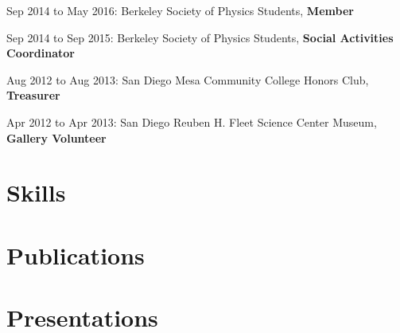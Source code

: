 \documentclass[
]{scrartcl}
\begin{document}
Sep 2014 to May 2016: Berkeley Society of Physics Students,
\textbf{Member}

Sep 2014 to Sep 2015: Berkeley Society of Physics Students,
\textbf{Social Activities Coordinator}

Aug 2012 to Aug 2013: San Diego Mesa Community College Honors Club,
\textbf{Treasurer}

Apr 2012 to Apr 2013: San Diego Reuben H. Fleet Science Center Museum,
\textbf{Gallery Volunteer}

\hypertarget{fa-tools-skills}{%
\section{\texorpdfstring{
Skills}{ Skills}}\label{fa-tools-skills}}

\hypertarget{fa-pen-nib-publications}{%
\section{\texorpdfstring{
Publications}{ Publications}}\label{fa-pen-nib-publications}}

\newrefcontext[sorting=ddt]
\printbibliography[heading=none, keyword={mypublication}, keyword={selectedworks}]
\endrefcontext

\hypertarget{fa-chart-bar-presentations}{%
\section{\texorpdfstring{
Presentations}{ Presentations}}\label{fa-chart-bar-presentations}}

\newrefcontext[sorting=ddt]
\printbibliography[heading=none, keyword={mypresentation}, keyword={selectedworks}]
\endrefcontext


\end{document}
